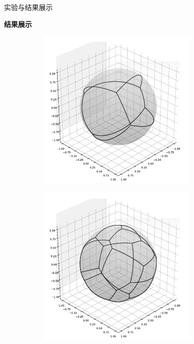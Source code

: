 \documentclass[12pt,aspectratio=169]{beamer}
\begin{document}
\begin{frame}{实验与结果展示}

  \textbf{结果展示}

  \vspace{-0.3cm}

  \begin{figure}[ht]
    \centering
  
    \begin{subfigure}[b]{0.2\textwidth}
      \centering
      \includegraphics[width=\linewidth]{fig/1.pdf}
      \label{subfig:1}
    \end{subfigure}
    \hfill
    \begin{subfigure}[b]{0.2\textwidth}
      \centering
      \includegraphics[width=\linewidth]{fig/2.pdf}

\end{subfigure}
\end{figure}
\end{frame}
\end{document}
